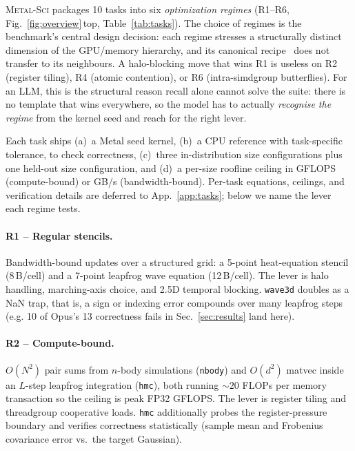 \documentclass{article}
\theoremstyle{plain}
\theoremstyle{definition}
\theoremstyle{remark}
\begin{document}
\textsc{Metal-Sci} packages 10 tasks into six \emph{optimization
regimes} (R1--R6, Fig.~\ref{fig:overview}\,top, Table~\ref{tab:tasks}). The choice of regimes is
the benchmark's central design decision: each regime stresses a
structurally distinct dimension of the GPU/memory hierarchy, and its
canonical recipe~\cite{datta,nyland2007fast,schonherr2011multi,anderson2008general,govindaraju2008high}
does not transfer to its neighbours. A halo-blocking move that wins
R1 is useless on R2 (register tiling), R4 (atomic contention), or R6
(intra-simdgroup butterflies). For an LLM, this is the structural
reason recall alone cannot solve the suite: there is no template that
wins everywhere, so the model has to actually \emph{recognise the
regime} from the kernel seed and reach for the right lever.

Each task ships (a)~a Metal seed kernel, (b)~a CPU reference with
task-specific tolerance, to check correctness, (c)~three in-distribution size configurations
plus one held-out size configuration, and (d)~a per-size roofline ceiling in
GFLOPS (compute-bound) or GB/s (bandwidth-bound). Per-task equations,
ceilings, and verification details are deferred to App.~\ref{app:tasks};
below we name the lever each regime tests.


\paragraph{R1 -- Regular stencils.} Bandwidth-bound updates over a
structured grid: a 5-point heat-equation stencil (8\,B/cell) and a
7-point leapfrog wave equation (12\,B/cell). The lever is halo
handling, marching-axis choice, and 2.5D temporal blocking.
\texttt{wave3d} doubles as a NaN trap, that is, a sign or indexing error
compounds over many leapfrog steps (e.g. 10 of Opus's 13 correctness
fails in Sec.~\ref{sec:results} land here).

\paragraph{R2 -- Compute-bound.} $O(N^2)$ pair sums from $n$-body simulations (\texttt{nbody})
and $O(d^2)$ matvec inside an $L$-step leapfrog integration (\texttt{hmc}), both
running ${\sim}20$ FLOPs per memory transaction so the ceiling is
peak FP32 GFLOPS. The lever is register tiling and threadgroup
cooperative loads. \texttt{hmc} additionally probes the
register-pressure boundary and verifies correctness
statistically (sample mean and Frobenius covariance error vs.\ the
target Gaussian).
\end{document}

